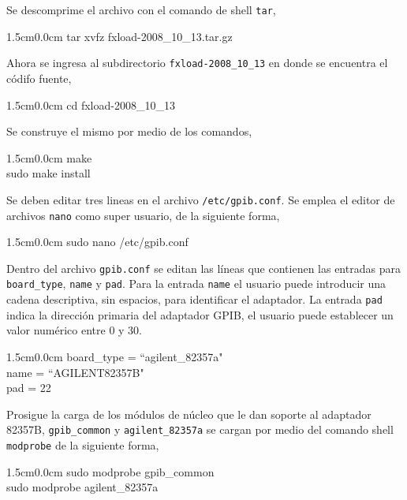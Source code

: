 \documentclass[paper=letter,oneside,fontsize=11pt, parskip=full]{scrartcl}
\newenvironment{code}
	{\begin{adjustwidth}{1.5cm}{0.0cm}\ttfamily}
	{\end{adjustwidth}}
\begin{document}
		Se descomprime el archivo con el comando de shell \texttt{tar},

		\begin{code}				
			tar xvfz fxload-2008\_10\_13.tar.gz
		\end{code}
	
		Ahora se ingresa al subdirectorio \texttt{fxload-2008\_10\_13} en donde se encuentra el códifo fuente,

		\begin{code}			
			cd fxload-2008\_10\_13
		\end{code}
		
		Se construye el mismo por medio de los comandos,
		
		\begin{code}	
			make	\\		
			sudo make install
		\end{code}
		
		Se deben editar tres lineas en el archivo \texttt{/etc/gpib.conf}. Se emplea el editor de archivos \texttt{nano} como super usuario, de la siguiente forma, 
		
		\begin{code}			
			sudo nano /etc/gpib.conf
		\end{code}
		
		Dentro del archivo \texttt{gpib.conf} se editan las líneas que contienen las entradas para \texttt{board\_type}, \texttt{name} y \texttt{pad}. Para la entrada \texttt{name} el usuario puede introducir una cadena descriptiva, sin espacios, para identificar el adaptador. La entrada \texttt{pad} indica la dirección primaria del adaptador GPIB, el usuario puede establecer un valor numérico entre 0 y 30.
		
		\begin{code}	
			board\_type = ``agilent\_82357a" \\		
			name = ``AGILENT82357B" \\		
			pad = 22
		\end{code}
		
		Prosigue la carga de los módulos de núcleo que le dan soporte al adaptador 82357B, \texttt{gpib\_common} y \texttt{agilent\_82357a} se cargan por medio del comando shell \texttt{modprobe} de la siguiente forma,
		
		\begin{code}
			sudo modprobe gpib\_common \\		
			sudo modprobe agilent\_82357a
		\end{code}
		
\end{document}
